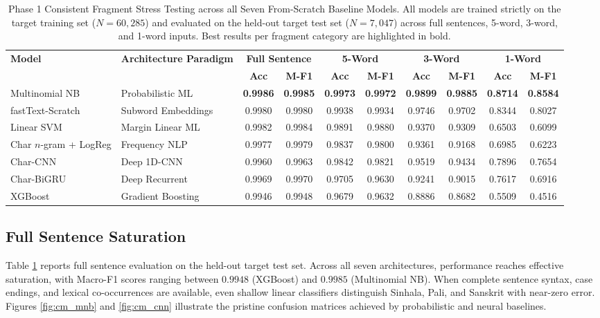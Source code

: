 \documentclass[11pt]{article}
\begin{document}
\begin{table}[t]
\centering
\small
\caption{Phase 1 Consistent Fragment Stress Testing across all Seven From-Scratch Baseline Models. All models are trained strictly on the target training set ($N=60,285$) and evaluated on the held-out target test set ($N=7,047$) across full sentences, 5-word, 3-word, and 1-word inputs. Best results per fragment category are highlighted in bold.}
\label{tab:frag_stress_consistent}
\begin{tabular}{ll cccccccc}
\toprule
\multirow{2}{*}{\textbf{Model}} & \multirow{2}{*}{\textbf{Architecture Paradigm}} & \multicolumn{2}{c}{\textbf{Full Sentence}} & \multicolumn{2}{c}{\textbf{5-Word}} & \multicolumn{2}{c}{\textbf{3-Word}} & \multicolumn{2}{c}{\textbf{1-Word}} \\
\cmidrule(lr){3-4} \cmidrule(lr){5-6} \cmidrule(lr){7-8} \cmidrule(lr){9-10}
& & \textbf{Acc} & \textbf{M-F1} & \textbf{Acc} & \textbf{M-F1} & \textbf{Acc} & \textbf{M-F1} & \textbf{Acc} & \textbf{M-F1} \\
\midrule
Multinomial NB & Probabilistic ML & \textbf{0.9986} & \textbf{0.9985} & \textbf{0.9973} & \textbf{0.9972} & \textbf{0.9899} & \textbf{0.9885} & \textbf{0.8714} & \textbf{0.8584} \\
fastText-Scratch & Subword Embeddings & 0.9980 & 0.9980 & 0.9938 & 0.9934 & 0.9746 & 0.9702 & 0.8344 & 0.8027 \\
Linear SVM & Margin Linear ML & 0.9982 & 0.9984 & 0.9891 & 0.9880 & 0.9370 & 0.9309 & 0.6503 & 0.6099 \\
Char $n$-gram + LogReg & Frequency NLP & 0.9977 & 0.9979 & 0.9837 & 0.9800 & 0.9361 & 0.9168 & 0.6985 & 0.6223 \\
Char-CNN & Deep 1D-CNN & 0.9960 & 0.9963 & 0.9842 & 0.9821 & 0.9519 & 0.9434 & 0.7896 & 0.7654 \\
Char-BiGRU & Deep Recurrent & 0.9969 & 0.9970 & 0.9705 & 0.9630 & 0.9241 & 0.9015 & 0.7617 & 0.6916 \\
XGBoost & Gradient Boosting & 0.9946 & 0.9948 & 0.9679 & 0.9632 & 0.8886 & 0.8682 & 0.5509 & 0.4516 \\
\bottomrule
\end{tabular}
\end{table}

\subsection{Full Sentence Saturation}
Table \ref{tab:frag_stress_consistent} reports full sentence evaluation on the held-out target test set. Across all seven architectures, performance reaches effective saturation, with Macro-F1 scores ranging between $0.9948$ (XGBoost) and $0.9985$ (Multinomial NB). When complete sentence syntax, case endings, and lexical co-occurrences are available, even shallow linear classifiers distinguish Sinhala, Pali, and Sanskrit with near-zero error. Figures \ref{fig:cm_mnb} and \ref{fig:cm_cnn} illustrate the pristine confusion matrices achieved by probabilistic and neural baselines.
\end{document}
